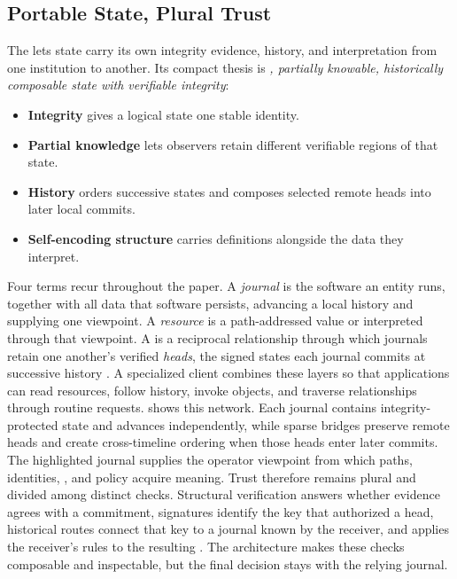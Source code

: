 \subsection{Portable State, Plural Trust}

The  lets state carry its own integrity evidence, history, and interpretation from one institution to another. Its compact thesis is \emph{, partially knowable, historically composable state with verifiable integrity}:

\begin{itemize}
  \item \textbf{Integrity} gives a logical state one stable identity.
  \item \textbf{Partial knowledge} lets observers retain different verifiable regions of that state.
  \item \textbf{History} orders successive states and composes selected remote heads into later local commits.
  \item \textbf{Self-encoding structure} carries definitions alongside the data they interpret.
\end{itemize}

Four terms recur throughout the paper. A \emph{journal} is the software an entity runs, together with all data that software persists, advancing a local history and supplying one viewpoint. A \emph{resource} is a path-addressed value or  interpreted through that viewpoint. A \emph{} is a reciprocal relationship through which journals retain one another's verified \emph{heads}, the signed states each journal commits at successive history . A specialized client combines these layers so that applications can read resources, follow history, invoke objects, and traverse relationships through routine requests.  shows this network. Each journal contains integrity-protected state and advances independently, while sparse bridges preserve remote heads and create cross-timeline ordering when those heads enter later commits. The highlighted journal supplies the operator viewpoint from which paths, identities, , and policy acquire meaning. Trust therefore remains plural and divided among distinct checks. Structural verification answers whether evidence agrees with a commitment, signatures identify the key that authorized a head, historical routes connect that key to a journal known by the receiver, and  applies the receiver's rules to the resulting . The architecture makes these checks composable and inspectable, but the final decision stays with the relying journal.

